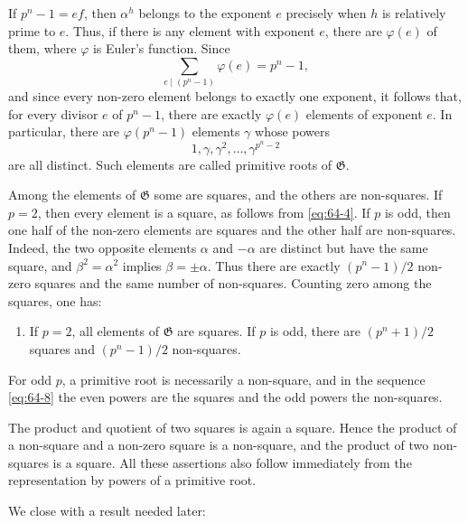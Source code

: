 \documentclass[11pt]{article}
\begin{document}
If \(p^n-1=ef\), then \(\alpha^h\) belongs to the exponent \(e\) precisely when \(h\) is relatively prime to \(e\).  Thus, if there is any element with exponent \(e\), there are \(\varphi(e)\) of them, where \(\varphi\) is Euler's function.  Since
\begin{equation}\label{eq:64-6}
 \sum_{e\mid(p^n-1)}\varphi(e)=p^n-1,
\end{equation}
and since every non-zero element belongs to exactly one exponent, it follows that, for every divisor \(e\) of \(p^n-1\), there are exactly \(\varphi(e)\) elements of exponent \(e\).  In particular, there are \(\varphi(p^n-1)\) elements \(\gamma\) whose powers
\begin{equation}\label{eq:64-8}
 1,\gamma,\gamma^2,\ldots,\gamma^{p^n-2}
\end{equation}
are all distinct.  Such elements are called primitive roots of \(\mathfrak G\).

Among the elements of \(\mathfrak G\) some are squares, and the others are non-squares.  If \(p=2\), then every element is a square, as follows from \eqref{eq:64-4}.  If \(p\) is odd, then one half of the non-zero elements are squares and the other half are non-squares.  Indeed, the two opposite elements \(\alpha\) and \(-\alpha\) are distinct but have the same square, and \(\beta^2=\alpha^2\) implies \(\beta=\pm\alpha\).  Thus there are exactly \((p^n-1)/2\) non-zero squares and the same number of non-squares.  Counting zero among the squares, one has:

\begin{enumerate}[label=\arabic*.,resume]
\item If \(p=2\), all elements of \(\mathfrak G\) are squares.  If \(p\) is odd, there are \((p^n+1)/2\) squares and \((p^n-1)/2\) non-squares.
\end{enumerate}
For odd \(p\), a primitive root is necessarily a non-square, and in the sequence \eqref{eq:64-8} the even powers are the squares and the odd powers the non-squares.

The product and quotient of two squares is again a square.  Hence the product of a non-square and a non-zero square is a non-square, and the product of two non-squares is a square.  All these assertions also follow immediately from the representation by powers of a primitive root.

We close with a result needed later:
\end{document}

